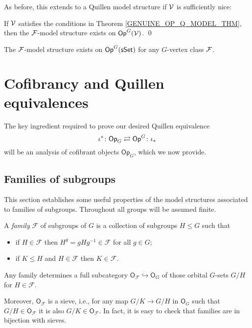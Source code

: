 \documentclass[a4paper,10pt]{article}%
\begin{document}
As before, this extends to a Quillen model structure if $\mathcal V$ is sufficiently nice:
\begin{theorem}
  If $\mathcal V$ satisfies the conditions in Theorem \ref{GENUINE_OP_Q_MODEL_THM}, then the $\mathcal F$-model structure exists on $\mathsf{Op}^G(\mathcal V)$. \qed
\end{theorem}

\begin{example}
  The $\mathcal F$-model structure exists on $\mathsf{Op}^G(\mathsf{sSet})$ for any $G$-vertex class $\mathcal F$.
\end{example}












\newpage




\section{Cofibrancy and Quillen equivalences}\label{COFIB SEC}



The key ingredient required to prove our desired Quillen equivalence
\[
\iota^{\**} \colon
\mathsf{Op}_G \rightleftarrows \mathsf{Op}^G
\colon \iota_{\**}
\]
will be an analysis of cofibrant objects $\mathsf{Op}_G$, which we now provide.


\subsection{Families of subgroups}


This section establishes some useful properties of the model structures associated to families of subgroups. Throughout all groups will be assumed finite.


\begin{definition}\label{FAMILY DEF}
  A \textit{family} $\mathcal{F}$ of subgroups of $G$ is a collection of subgroups 
  $H \leq G$ such that
  \begin{itemize}
  \item if $H \in \mathcal{F}$ then 
    $H^g = gHg^{-1} \in \mathcal{F}$ for all $g \in G$;
  \item if $K \leq H$ and $H \in \mathcal{F}$ then
    $K \in \mathcal{F}$.
  \end{itemize} 
\end{definition}

\begin{remark}
  Any family determines a full subcategory 
  $\mathsf{O}_{\mathcal{F}} \hookrightarrow \mathsf{O}_G$
  of those orbital $G$-sets $G/H$ for 
  $H \in \mathcal{F}$.
  
  Moreover, $\mathsf{O}_{\mathcal{F}}$ is a sieve, i.e., for any map $G/K \to G/H$ in $\mathsf{O}_G$ such that $G/H \in \mathsf{O}_{\mathcal{F}}$ it is also $G/K \in \mathsf{O}_{\mathcal{F}}$. In fact, it is easy to check that families are in bijection with sieves.
\end{remark}
\end{document}
